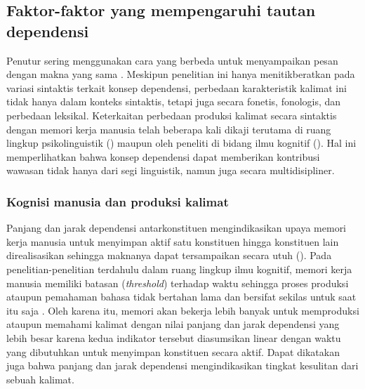 \subsection{Faktor-faktor yang mempengaruhi tautan dependensi}
Penutur sering menggunakan cara yang berbeda untuk menyampaikan pesan dengan makna yang sama \citep{kroch2001syntactic}. Meskipun penelitian ini hanya menitikberatkan pada variasi sintaktis terkait konsep dependensi, perbedaan karakteristik kalimat ini tidak hanya dalam konteks sintaktis, tetapi juga secara fonetis, fonologis, dan perbedaan leksikal. Keterkaitan perbedaan produksi kalimat secara sintaktis dengan memori kerja manusia telah beberapa kali dikaji terutama di ruang lingkup psikolinguistik (\citealp{jay2003psychology, levy2013surprisal}) maupun oleh peneliti di bidang ilmu kognitif (\citealp{futrell2015large, christiansen2016now, liu2017dependency}). Hal ini memperlihatkan bahwa konsep dependensi dapat memberikan kontribusi wawasan tidak hanya dari segi linguistik, namun juga secara multidisipliner.

\subsubsection{Kognisi manusia dan produksi kalimat}
Panjang dan jarak dependensi antarkonstituen mengindikasikan upaya memori kerja manusia untuk menyimpan aktif satu konstituen hingga konstituen lain direalisasikan sehingga maknanya dapat tersampaikan secara utuh (\citealp{hudson2003psychological, liu2008dependency}). Pada penelitian-penelitian terdahulu dalam ruang lingkup ilmu kognitif, memori kerja manusia memiliki batasan (\textit{threshold}) terhadap waktu sehingga proses produksi ataupun pemahaman bahasa tidak bertahan lama dan bersifat sekilas untuk saat itu saja \citep{christiansen2016now}. Oleh karena itu, memori akan bekerja lebih banyak untuk memproduksi ataupun memahami kalimat dengan nilai panjang dan jarak dependensi yang lebih besar karena kedua indikator tersebut diasumsikan linear dengan waktu yang dibutuhkan untuk menyimpan konstituen secara aktif. Dapat dikatakan juga bahwa panjang dan jarak dependensi mengindikasikan tingkat kesulitan dari sebuah kalimat. 

